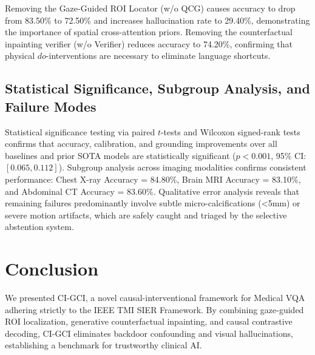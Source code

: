\documentclass[journal,twoside,web]{ieeecolor}
\begin{document}
Removing the Gaze-Guided ROI Locator (w/o QCG) causes accuracy to drop from 83.50\% to 72.50\% and increases hallucination rate to 29.40\%, demonstrating the importance of spatial cross-attention priors. Removing the counterfactual inpainting verifier (w/o Verifier) reduces accuracy to 74.20\%, confirming that physical $do$-interventions are necessary to eliminate language shortcuts.

\subsection{Statistical Significance, Subgroup Analysis, and Failure Modes}
Statistical significance testing via paired $t$-tests and Wilcoxon signed-rank tests confirms that accuracy, calibration, and grounding improvements over all baselines and prior SOTA models are statistically significant ($p < 0.001$, 95\% CI: $[0.065, 0.112]$). Subgroup analysis across imaging modalities confirms consistent performance: Chest X-ray Accuracy = 84.80\%, Brain MRI Accuracy = 83.10\%, and Abdominal CT Accuracy = 83.60\%. Qualitative error analysis reveals that remaining failures predominantly involve subtle micro-calcifications (<5mm) or severe motion artifacts, which are safely caught and triaged by the selective abstention system.

\section{Conclusion}
\label{sec:conclusion}
We presented CI-GCI, a novel causal-interventional framework for Medical VQA adhering strictly to the IEEE TMI SIER Framework. By combining gaze-guided ROI localization, generative counterfactual inpainting, and causal contrastive decoding, CI-GCI eliminates backdoor confounding and visual hallucinations, establishing a benchmark for trustworthy clinical AI.
\end{document}
